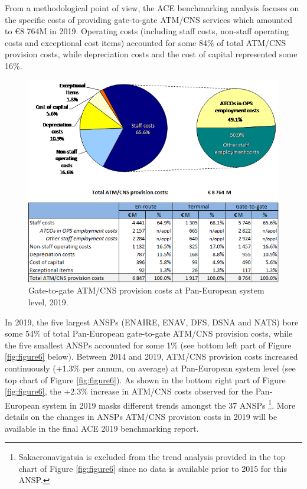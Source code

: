 \documentclass[
]{book}
\begin{document}
From a methodological point of view, the ACE benchmarking analysis focuses on the specific costs of providing gate-to-gate ATM/CNS services which amounted to €8 764M in 2019. Operating costs (including staff costs, non-staff operating costs and exceptional cost items) accounted for some 84\% of total ATM/CNS provision costs, while depreciation costs and the cost of capital represented some 16\%.



\begin{figure}

{\centering \includegraphics[width=1\linewidth]{figures/Figure 2-2} 

}

\caption{Gate-to-gate ATM/CNS provision costs at Pan-European system level, 2019.}\label{fig:figure5}
\end{figure}

In 2019, the five largest ANSPs (ENAIRE, ENAV, DFS, DSNA and NATS) bore some 54\% of total Pan-European gate-to-gate ATM/CNS provision costs, while the five smallest ANSPs accounted for some 1\% (see bottom left part of Figure \ref{fig:figure6} below). Between 2014 and 2019, ATM/CNS provision costs increased continuously (+1.3\% per annum, on average) at Pan-European system level (see top chart of Figure \ref{fig:figure6}). As shown in the bottom right part of Figure \ref{fig:figure6}, the +2.3\% increase in ATM/CNS costs observed for the Pan-European system in 2019 masks different trends amongst the 37 ANSPs \footnote{Sakaeronavigatsia is excluded from the trend analysis provided in the top chart of Figure \ref{fig:figure6} since no data is available prior to 2015 for this ANSP.}. More details on the changes in ANSPs ATM/CNS provision costs in 2019 will be available in the final ACE 2019 benchmarking report.
\end{document}
